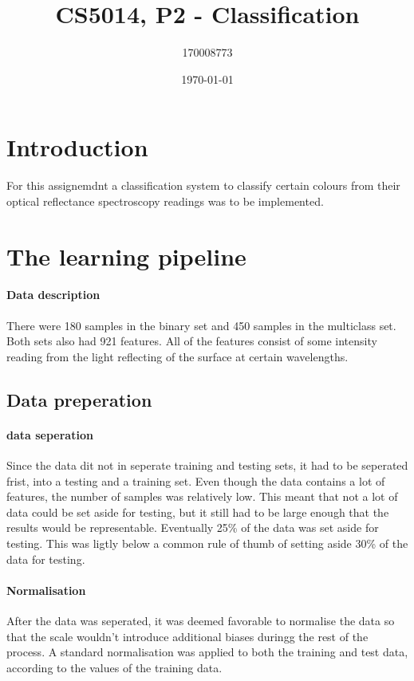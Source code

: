 \documentclass[british]{article}
\title{CS5014, P2 - Classification}
\author{170008773}
\date{\today}
\begin{document}
\maketitle

\section{Introduction}
\label{intro}
For this assignemdnt a classification system to classify certain colours from their optical reflectance spectroscopy readings was to be implemented. 
\section{The learning pipeline}
\label{content}

\paragraph{Data description}There were 180 samples in the binary set and 450 samples in the multiclass set. Both sets also had 921 features. All of the features consist of some intensity reading from the light reflecting of the surface at certain wavelengths.   

\subsection{Data preperation}
\paragraph{data seperation} Since the data dit not in seperate training and testing sets, it had to be seperated frist, into a testing and a training set. Even though the data contains a lot of features, the number of samples was relatively low. This meant that not a lot of data could be set aside for testing, but it still had to be large enough that the results would be representable. Eventually 25\% of the data was set aside for testing. This was ligtly below a common rule of thumb of setting aside 30\% of the data for testing. 

\paragraph{Normalisation} After the data was seperated, it was deemed favorable to normalise the data so that the scale wouldn't introduce additional biases duringg the rest of the process. A standard normalisation was applied to both the training and test data, according to the values of the training data. 
\end{document}

